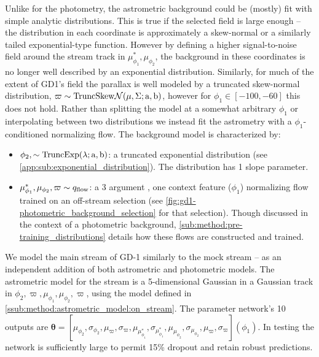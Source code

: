 \documentclass[twocolumn]{aastex631}
\newcommand{\stream}[1]{#1}
\newcommand{\mbs}[1]{\boldsymbol{#1}}
\newcommand{\mcal}[1]{\mathcal{#1}}
\newcommand{\parallax}{\varpi}
\begin{document}
        Unlike for the photometry, the astrometric background could be (mostly)
        fit with simple analytic distributions.  This is true if the selected
        field is large enough -- the distribution in each coordinate is
        approximately a skew-normal or a similarly tailed exponential-type
        function. However by defining a higher signal-to-noise field around the
        \citet{Ibata+2021} stream track in $\mu_{\phi_1}^*, \mu_{\phi_2}$, the
        background in these coordinates is no longer well described by an
        exponential distribution. Similarly, for much of the extent of
        \stream{GD1's} field the parallax is well modeled by a truncated
        skew-normal distribution, $\parallax \sim \rm{TruncSkew}\mcal{N}(\mu,
        \Sigma; a, b)$, however for $\phi_1 \in [-100, -60]$ this does not hold.
        Rather than splitting the model at a somewhat arbitrary $\phi_1$ or
        interpolating between two distributions we instead fit the astrometry
        with a $\phi_1$-conditioned normalizing flow. The background model is
        characterized by:

        \begin{itemize}
            \setlength\itemsep{0em}
            \item $\phi_2, \sim \rm{TruncExp}(\lambda; a, b)$: a truncated
                exponential distribution (see
                \autoref{app:sub:exponential_distribution}).  The distribution
                has 1 slope parameter.
            \item $\mu_{\phi_1}^*, \mu_{\phi_2}, \varpi \sim q_{\rm flow}$: a 3
                argument , one context feature ($\phi_1$) normalizing flow
                trained on an off-stream selection (see
                \autoref{fig:gd1-photometric_background_selection} for that
                selection). Though discussed in the context of a photometric
                background, \autoref{sub:method:pre-training_distributions}
                details how these flows are constructed and trained.
        \end{itemize}

        We model the main stream of \stream{GD-1} similarly to the mock stream
        -- as an independent addition of both astrometric and photometric
        models.  The astrometric model for the stream is a 5-dimensional
        Gaussian in a Gaussian track in $\phi_2, \parallax, \mu_{\phi_1},
        \mu_{\phi_2}, \parallax$, using the model defined in
        \autoref{ssub:method:astrometric_model:on_stream}.  The parameter
        network's 10 outputs are $\mbs{\theta} = [\mu_{\phi_2}, \sigma_{\phi_2},
        \mu_\parallax, \sigma_\parallax, \mu_{\mu_{\phi_1}^*},
        \sigma_{\mu_{\phi_1}^*}, \mu_{\mu_{\phi_2}}, \sigma_{\mu_{\phi_2}},
        \mu_\parallax, \sigma_\parallax](\phi_1)$.  In testing the network is
        sufficiently large to permit 15\% dropout and retain robust predictions.
\end{document}
